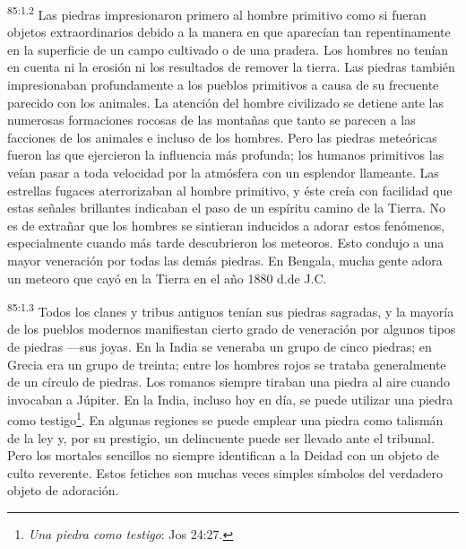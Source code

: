 \documentclass[twoside, 11pt]{book}
\begin{document}
\par
\textsuperscript{85:1.2} Las piedras impresionaron primero al hombre primitivo como si fueran objetos extraordinarios debido a la manera en que aparecían tan repentinamente en la superficie de un campo cultivado o de una pradera. Los hombres no tenían en cuenta ni la erosión ni los resultados de remover la tierra. Las piedras también impresionaban profundamente a los pueblos primitivos a causa de su frecuente parecido con los animales. La atención del hombre civilizado se detiene ante las numerosas formaciones rocosas de las montañas que tanto se parecen a las facciones de los animales e incluso de los hombres. Pero las piedras meteóricas fueron las que ejercieron la influencia más profunda; los humanos primitivos las veían pasar a toda velocidad por la atmósfera con un esplendor llameante. Las estrellas fugaces aterrorizaban al hombre primitivo, y éste creía con facilidad que estas señales brillantes indicaban el paso de un espíritu camino de la Tierra. No es de extrañar que los hombres se sintieran inducidos a adorar estos fenómenos, especialmente cuando más tarde descubrieron los meteoros. Esto condujo a una mayor veneración por todas las demás piedras. En Bengala, mucha gente adora un meteoro que cayó en la Tierra en el año 1880 d.de J.C.

\par
\textsuperscript{85:1.3} Todos los clanes y tribus antiguos tenían sus piedras sagradas, y la mayoría de los pueblos modernos manifiestan cierto grado de veneración por algunos tipos de piedras ---sus joyas. En la India se veneraba un grupo de cinco piedras; en Grecia era un grupo de treinta; entre los hombres rojos se trataba generalmente de un círculo de piedras. Los romanos siempre tiraban una piedra al aire cuando invocaban a Júpiter. En la India, incluso hoy en día, se puede utilizar una piedra como testigo\footnote{\textit{Una piedra como testigo}: Jos 24:27.}. En algunas regiones se puede emplear una piedra como talismán de la ley y, por su prestigio, un delincuente puede ser llevado ante el tribunal. Pero los mortales sencillos no siempre identifican a la Deidad con un objeto de culto reverente. Estos fetiches son muchas veces simples símbolos del verdadero objeto de adoración.
\end{document}
